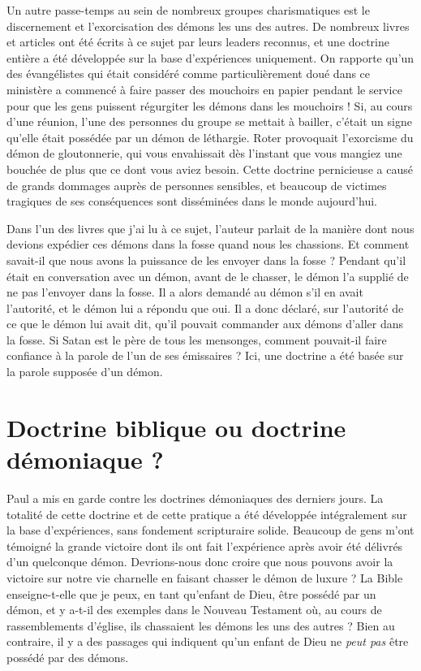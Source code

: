 Un autre passe-temps au sein de nombreux groupes charismatiques
 est le discernement et l'exorcisation des démons les uns des autres.
 De nombreux livres et articles ont été écrits à ce sujet par leurs leaders
 reconnus, et une doctrine entière a été développée sur la base d'expériences
 uniquement. On rapporte qu'un des évangélistes qui était considéré
 comme particulièrement doué dans ce ministère a commencé à faire passer
 des mouchoirs en papier pendant le service pour que les gens puissent
 régurgiter les démons dans les mouchoirs ! Si, au cours d'une réunion,
 l'une des personnes du groupe se mettait à bailler, c'était un signe
 qu'elle était possédée par un démon de léthargie. Roter provoquait
 l'exorcisme du démon de gloutonnerie, qui vous envahissait dès l'instant
 que vous mangiez une bouchée de plus que ce dont vous aviez besoin.
 Cette doctrine pernicieuse a causé de grands dommages auprès de personnes
 sensibles, et beaucoup de victimes tragiques de ses conséquences
 sont disséminées dans le monde aujourd'hui.

Dans l'un des livres que j'ai lu à ce sujet, l'auteur parlait
 de la manière dont nous devions expédier ces démons dans la fosse
 quand nous les chassions. Et comment savait-il que nous avons la puissance
 de les envoyer dans la fosse ? Pendant qu'il était en conversation
 avec un démon, avant de le chasser, le démon l'a supplié de ne pas
 l'envoyer dans la fosse. Il a alors demandé au démon s'il en avait
 l'autorité, et le démon lui a répondu que oui.
 Il a donc déclaré, sur l'autorité de ce que le démon lui avait dit,
 qu'il pouvait commander aux démons d'aller dans la fosse.
 Si Satan est le père de tous les mensonges, comment pouvait-il faire
 confiance à la parole de l'un de ses émissaires ?
 Ici, une doctrine a été basée sur la parole supposée d'un démon.


\section*{Doctrine biblique ou doctrine démoniaque ?}

Paul a mis en garde contre les doctrines démoniaques des derniers jours.
 La totalité de cette doctrine et de cette pratique a été développée intégralement
 sur la base d'expériences, sans fondement scripturaire solide.
 Beaucoup de gens m'ont témoigné la grande victoire dont ils ont fait
 l'expérience après avoir été délivrés d'un quelconque démon.
 Devrions-nous donc croire que nous pouvons avoir la victoire
 sur notre vie charnelle en faisant chasser le démon de luxure ?
 La Bible enseigne-t-elle que je peux, en tant qu'enfant de Dieu,
 être possédé par un démon, et y a-t-il des exemples dans le Nouveau
 Testament où, au cours de rassemblements d'église, ils chassaient
 les démons les uns des autres ? Bien au contraire, il y a des passages
 qui indiquent qu'un enfant de Dieu ne \emph{peut pas} être possédé par des démons.

